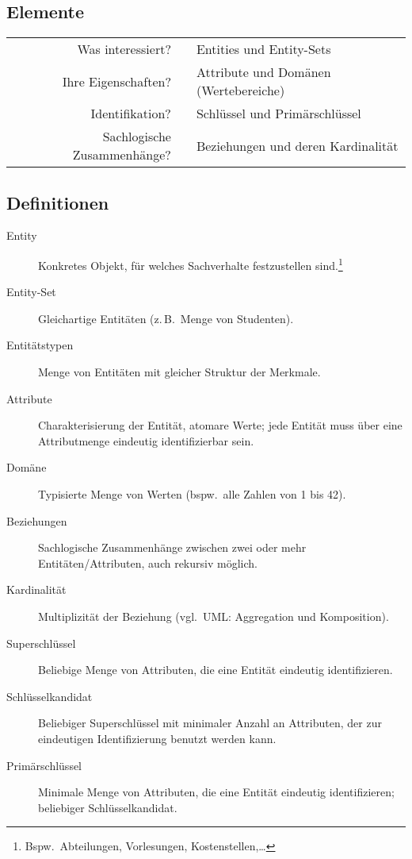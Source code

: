 \subsection{Elemente}

\begin{center}
\begin{tabular}{rcl}
Was interessiert? & \lyxarrow{} & Entities und Entity-Sets \\
Ihre Eigenschaften? & \lyxarrow{} & Attribute und Domänen (Wertebereiche) \\
Identifikation? & \lyxarrow{} & Schlüssel und Primärschlüssel \\
Sachlogische Zusammenhänge? & \lyxarrow{} & Beziehungen und deren Kardinalität
\end{tabular}
\end{center}


\subsection{Definitionen}
\begin{description}
\item [{Entity}] Konkretes Objekt, für welches Sachverhalte festzustellen
sind.\footnote{
	Bspw.~Abteilungen, Vorlesungen, Kostenstellen,\ldots{}
}
\item [{Entity-Set}] Gleichartige Entitäten (z.\,B.~Menge von Studenten).
\item [{Entitätstypen}] Menge von Entitäten mit gleicher Struktur der Merkmale.
\item [{Attribute}] Charakterisierung der Entität, atomare Werte; jede
Entität muss über eine Attributmenge eindeutig identifizierbar sein.
\item [{Domäne}] Typisierte Menge von Werten (bspw.~alle Zahlen von 1
bis 42).
\item [{Beziehungen}] Sachlogische Zusammenhänge zwischen zwei oder mehr
Entitäten\slash{}Attributen, auch rekursiv möglich.
\item [{Kardinalität}] Multiplizität der Beziehung (vgl.~UML: Aggregation
und Komposition).
\item [{Superschlüssel}] Beliebige Menge von Attributen, die eine Entität
eindeutig identifizieren.
\item [{Schlüsselkandidat}] Beliebiger Superschlüssel mit minimaler Anzahl
an Attributen, der zur eindeutigen Identifizierung benutzt werden
kann.
\item [{Primärschlüssel}] Minimale Menge von Attributen, die eine Entität
eindeutig identifizieren; beliebiger Schlüsselkandidat.
\end{description}

